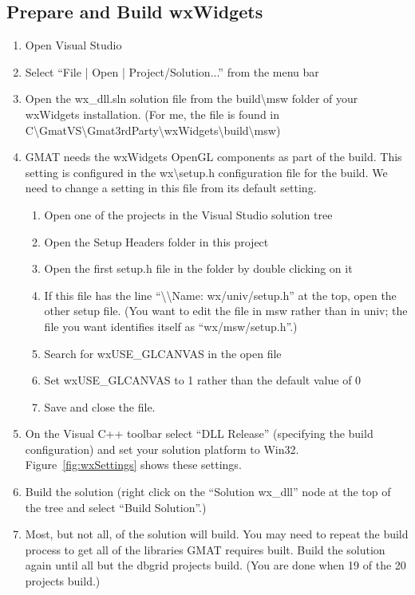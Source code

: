 \documentclass[letterpaper,10pt]{article}%
\begin{document}
\subsection{Prepare and Build wxWidgets}
\begin{enumerate}
\item Open Visual Studio
\item Select ``File | Open | Project/Solution...'' from the menu bar
\item Open the wx\_dll.sln solution file from the build\textbackslash msw folder of your wxWidgets installation.  (For me, the file is found in  C\:\textbackslash GmatVS\textbackslash Gmat3rdParty\textbackslash wxWidgets\textbackslash build\textbackslash msw)
\item GMAT needs the wxWidgets OpenGL components as part of the build.  This setting is configured in the wx\textbackslash setup.h configuration file for the build.  We need to change a setting in this file from its default setting.
\begin{enumerate}
	\item Open one of the projects in the Visual Studio solution tree
	\item Open the Setup Headers folder in this project
	\item Open the first setup.h file in the folder by double clicking on it
	\item If this file has the line ``\textbackslash\textbackslash  Name:        wx/univ/setup.h'' at the top, open the other setup file. (You want to edit the file in msw rather than in univ; the file you want identifies itself as ``wx/msw/setup.h''.)
	\item Search for wxUSE\_GLCANVAS in the open file
	\item Set wxUSE\_GLCANVAS to 1 rather than the default value of 0
	\item Save and close the file.
\end{enumerate}
\item On the Visual C++ toolbar select ``DLL Release'' (specifying the build configuration) and set your solution platform to Win32.  Figure~\ref{fig:wxSettings} shows these settings.
\item Build the solution (right click on the ``Solution wx\_dll{}'' node at the top of the tree and select ``Build Solution''.)
\item Most, but not all, of the solution will build.  You may need to repeat the build process to get all of the libraries GMAT requires built.  Build the solution again until all but the dbgrid projects build.  (You are done when 19 of the 20 projects build.)

\end{enumerate}
\end{document}
